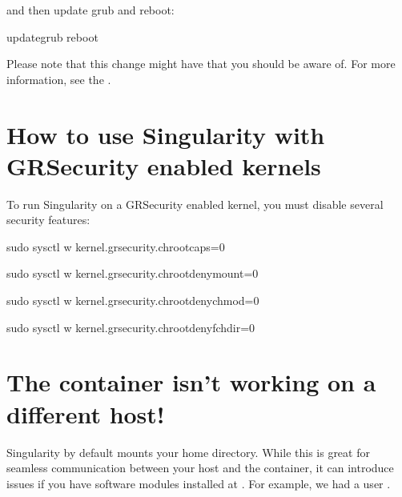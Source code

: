 \documentclass[letterpaper,10pt,english]{sphinxmanual}
\begin{document}
and then update grub and reboot:

%
\begin{sphinxVerbatim}[commandchars=\\\{\}]
update\PYGZhy{}grub \PYGZam{}\PYGZam{} reboot
\end{sphinxVerbatim}

Please note that this change might have  that
you should be aware of. For more information, see the .


\section{How to use Singularity with GRSecurity enabled kernels}
\label{\detokenize{troubleshooting:how-to-use-singularity-with-grsecurity-enabled-kernels}}
\begin{DUlineblock}{0em}
\item[] To run Singularity on a GRSecurity enabled kernel, you must disable
several security features:
\end{DUlineblock}

%
\begin{sphinxVerbatim}[commandchars=\\\{\}]
\PYGZdl{} sudo sysctl \PYGZhy{}w kernel.grsecurity.chroot\PYGZus{}caps=0

\PYGZdl{} sudo sysctl \PYGZhy{}w kernel.grsecurity.chroot\PYGZus{}deny\PYGZus{}mount=0

\PYGZdl{} sudo sysctl \PYGZhy{}w kernel.grsecurity.chroot\PYGZus{}deny\PYGZus{}chmod=0

\PYGZdl{} sudo sysctl \PYGZhy{}w kernel.grsecurity.chroot\PYGZus{}deny\PYGZus{}fchdir=0
\end{sphinxVerbatim}


\section{The container isn’t working on a different host!}
\label{\detokenize{troubleshooting:the-container-isnt-working-on-a-different-host}}
Singularity by default mounts your home directory. While this is great
for seamless communication between your host and the container, it can
introduce issues if you have software modules installed at . For
example, we had a user .
\end{document}
